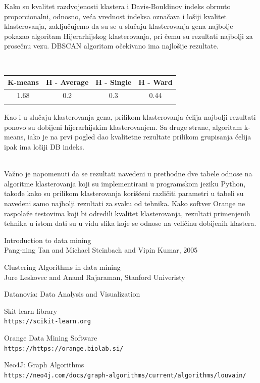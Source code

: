 \documentclass[a4paper]{article}
\begin{document}
Kako su kvalitet razdvojenosti klastera i Davis-Bouldinov indeks obrnuto proporcionalni, odnosno, veća vrednost indeksa označava i lošiji kvalitet klasterovanja, zaključujemo da su se u slučaju klasterovanja gena najbolje pokazao algoritam Hijerarhijskog klasterovanja, pri čemu su rezultati najbolji za prosečnu vezu. DBSCAN algoritam očekivano ima najlošije rezultate.

\\

\begin{center}
 \begin{tabular}{||c c c c||} 
 \hline
 K-means & H - Average & H - Single & H - Ward \\ [0.5ex] 
 \hline\hline
 1.68 & 0.2 & 0.3 & 0.44\\ 
 \hline
\caption{\label{tab:table-name}KLASTEROVANJE ĆELIJA}
\end{tabular}
\end{center}

Kao i u slučaju klasterovanja gena, prilikom klasterovanja ćelija najbolji rezultati ponovo su dobijeni hijerarhijskim klasterovanjem. Sa druge strane, algoritam k-means, iako je na prvi pogled dao kvalitetne rezultate prilikom grupisanja ćelija ipak ima lošiji DB indeks.

\\

Važno je napomenuti da se rezultati navedeni u prethodne dve tabele odnose na algoritme klasterovanja koji su implementirani u programskom jeziku Python, takođe kako su prilikom klasterovanja korišćeni različiti parametri u tabeli su navedeni samo najbolji rezultati za svaku od tehnika. Kako softver Orange ne raspolaže testovima koji bi odredili kvalitet klasterovanja, rezultati primenjenih tehnika u istom dati su u vidu slika koje se odnose na veličinu dobijenih klastera.



\begin{thebibliography}{9}

Introduction to data mining\\
Pang-ning Tan and Michael Steinbach and Vipin Kumar, 2005

Clustering Algorithms in data mining\\
Jure Leskovec and Anand Rajaraman, Stanford Univeristy
 
Datanovia: Data Analysis and Visualization 
 
Skit-learn library
\\\texttt{https://scikit-learn.org}

Orange Data Mining Software
\\\texttt{https://https://orange.biolab.si/}
 
Neo4J: Graph Algorithms
\\\texttt{https://neo4j.com/docs/graph-algorithms/current/algorithms/louvain/}
\end{thebibliography}
\end{document}
